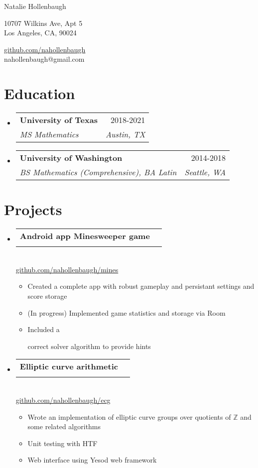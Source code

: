 \documentclass[letterpaper,11pt]{article}
\makeatletter
\newcommand{\resumeItem}[1]{
  \item{
    {#1 \vspace{-4pt}}
  }
}
\newcommand{\resumeSubheading}[4]{
  \vspace{-2pt}\item
    \begin{tabular*}{0.97\textwidth}[t]{l@{\extracolsep{\fill}}r}
      \textbf{#1} & #2 \\
      \textit{\small #3} & \textit{\small #4} \\
    \end{tabular*}\vspace{-10pt}
}
\newcommand{\resumeSubHeadingListStart}{\begin{itemize}[leftmargin=0.15in, label={}]}
\newcommand{\resumeSubHeadingListEnd}{\end{itemize}}
\newcommand{\resumeItemListStart}{\begin{itemize}}
\newcommand{\resumeItemListEnd}{\end{itemize}\vspace{-2pt}}
\newcommand\commenttt[1]{}
\makeatother
\begin{document}
\begin{center}
    {\LARGE Natalie Hollenbaugh} \\ \vspace{0pt}
    \begin{multicols}{2}
    \begin{flushleft}
    \large{10707 Wilkins Ave, Apt 5} \\
    \large{Los Angeles, CA, 90024} \\
    \end{flushleft}
    
    \begin{flushright}
    \href{https://github.com/nahollenbaugh}{\large{github.com/nahollenbaugh}}\\
    \href{mailto:{nahollenbaugh@gmail.com}} \large{nahollenbaugh@gmail.com}
    \end{flushright}
    \end{multicols}
\end{center}


\section{Education}
\resumeSubHeadingListStart

    \resumeSubheading
        {University of Texas}{2018-2021}
        {MS Mathematics}
        {Austin, TX}
    \resumeSubheading
        {University of Washington}{2014-2018}
        {BS Mathematics (Comprehensive), BA Latin}
        {Seattle, WA}

\resumeSubHeadingListEnd

\section{Projects}
\resumeSubHeadingListStart
\resumeSubheading{Android app Minesweeper game}{}{}{}\\\vspace{-1ex}
  \hspace{2em}\href{https://github.com/nahollenbaugh/mines}{github.com/nahollenbaugh/mines}\vspace{-1ex}
  \resumeItemListStart\small
    \resumeItem{Created a complete app with robust gameplay and persistant settings and 
      score storage}
    \resumeItem{(In progress) Implemented game statistics and storage via Room}
    \resumeItem{Included a 
      \commenttt{efficient and (rmk. make meaningful)}
      correct solver algorithm to provide hints}
  \resumeItemListEnd
\resumeSubheading{Elliptic curve arithmetic}{}{}{}\\\vspace{-1ex}
  \hspace{2em}\href{https://github.com/nahollenbaugh/ecg}{github.com/nahollenbaugh/ecg}\vspace{-1ex}
  \resumeItemListStart\small
    \resumeItem{Wrote an implementation of elliptic curve groups over quotients of 
      $\mathbb Z$ and some related algorithms}
    \resumeItem{Unit testing with HTF}
    \resumeItem{Web interface using Yesod web framework}
  \resumeItemListEnd
\resumeSubHeadingListEnd
\end{document}
